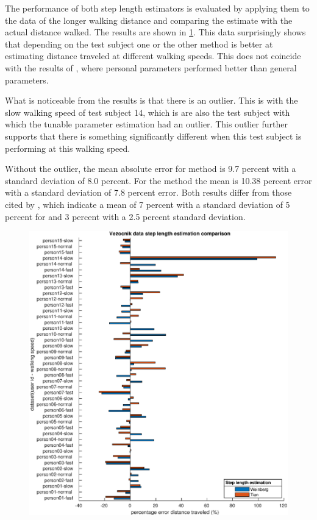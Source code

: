 The performance of both step length estimators is evaluated by applying them to the data of the longer walking distance and comparing the estimate with the actual distance walked. The results are shown in  \cref{fig:202011131943_wienberg_vs_tian_vezocnik_data1}. This data surprisingly shows that depending on the test subject one or the other method is better at estimating distance traveled at different walking speeds. This does not coincide with the results of \cite{Vezocnik2019}, where personal parameters performed better than general parameters.

What is noticeable from the results is that there is an outlier. This is with the slow walking speed of test subject 14, which is are also the test subject with which the tunable parameter estimation had an outlier. This outlier further supports that there is something significantly different when this test subject is performing at this walking speed.\par 

 Without the outlier, the mean absolute error for \citet{Tian2016} method is 9.7 percent with a standard deviation of 8.0 percent. For the \citet{weinberg} method the mean is 10.38 percent error with a standard deviation of 7.8 percent error. Both results differ from those cited by \cite{Vezocnik2019}, which indicate a mean of 7 percent with a standard deviation of 5 percent for \citet{Tian2016} and 3 percent with a 2.5 percent standard deviation.

\par

\begin{figure}[H]
	\centering
	\includegraphics[width=\linewidth]{images/20201113_1943_wienberg_vs_tian_vezocnik_data_1}
	\caption{}
	\label{fig:202011131943_wienberg_vs_tian_vezocnik_data1}
\end{figure}
 
